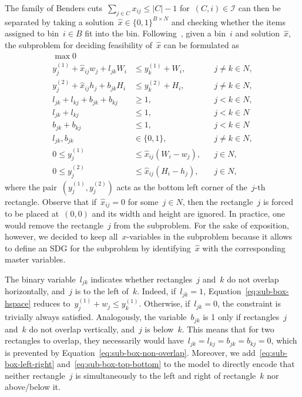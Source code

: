 \documentclass[a4paper,10pt]{article}
\newcommand{\B}[1]{\{0,1\}^{#1}}
\newcommand{\fixed}[1]{\hat{ #1 }}
\newcommand{\card}[1]{\left\lvert #1 \right\rvert}
\theoremstyle{definition}
\begin{document}
The family of Benders cuts~$\sum_{j \in C} x_{ij} \leq \card{C} - 1$ for~$(C,i) \in \mathcal{I}$ can then be separated by taking a solution~$\fixed{x} \in \B{B \times N}$ and checking whether the items assigned to bin~$i \in B$ fit into the bin.
Following~\cite{pisinger2007using}, given a bin~$i$ and solution~$\fixed{x}$, the subproblem for deciding feasibility of~$\fixed{x}$ can be formulated as
% 
\begin{subequations}
  \label{eq:subproblem-2DRP}
  \begin{align}
    \max 0 &&& \nonumber \\
    y^{(1)}_j + \fixed{x}_{ij}w_j + l_{jk} W_i &\leq y^{(1)}_k + W_i, && j\neq k\in N, \label{eq:sub-box-hspace} \\ 
    y^{(2)}_j + \fixed{x}_{ij}h_j + b_{jk} H_i &\leq y^{(2)}_k + H_i, && j\neq k\in N, \label{eq:sub-box-vspace} \\
    l_{jk} + l_{kj} + b_{jk} + b_{kj} &\geq 1, && j < k\in N, \label{eq:sub-box-non-overlap} \\
    l_{jk} + l_{kj} &\leq 1, && j < k\in N \label{eq:sub-box-left-right}\\
    b_{jk} + b_{kj} &\leq 1, && j < k\in N \label{eq:sub-box-top-bottom} \\
    l_{jk}, b_{jk} &\in \{0, 1\}, && j\neq k \in N, \\
    0 \leq y^{(1)}_j &\leq \fixed{x}_{ij}(W_i - w_j), && j\in N, \\
    0 \leq y^{(2)}_j &\leq \fixed{x}_{ij}(H_i - h_j), && j\in N,
  \end{align}
\end{subequations}
% 
where the pair~$(y^{(1)}_j, y^{(2)}_j)$ acts as the bottom left corner of the~$j$-th rectangle.
Observe that if~$\fixed{x}_{ij} = 0$ for some~$j \in N$, then the rectangle~$j$ is forced to be placed at~$(0, 0)$ and its width and height are ignored. 
In practice, one would remove the rectangle~$j$ from the subproblem.
For the sake of exposition, however, we decided to keep all~$x$-variables in the subproblem because it allows to define an SDG for the subproblem by identifying~$\hat{x}$ with the corresponding master variables.

The binary variable~$l_{jk}$ indicates whether rectangles~$j$ and~$k$ do not overlap horizontally, and~$j$ is to the left of~$k$.
Indeed, if~$l_{jk}=1$, Equation~\eqref{eq:sub-box-hspace} reduces to~$y^{(1)}_j + w_j \leq y^{(1)}_k$.
Otherwise, if~$l_{jk} =0$, the constraint is trivially always satisfied.
Analogously, the variable~$b_{jk}$ is 1 only if rectangles~$j$ and~$k$ do not overlap vertically, and~$j$ is below~$k$.
This means that for two rectangles to overlap, they necessarily would have~$l_{jk} = l_{kj} = b_{jk} = b_{kj} = 0$, which is prevented by Equation~\eqref{eq:sub-box-non-overlap}.
Moreover, we add~\eqref{eq:sub-box-left-right} and~\eqref{eq:sub-box-top-bottom} to the model to directly encode that neither rectangle~$j$ is simultaneously to the left and right of rectangle~$k$ nor above/below it.
\end{document}
